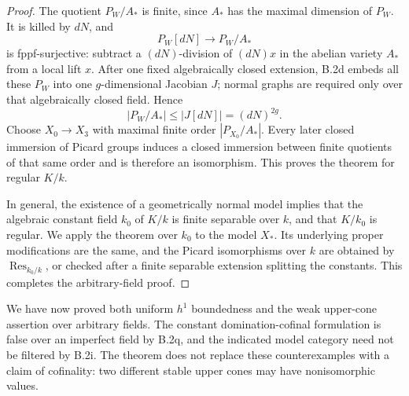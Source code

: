 \begin{proof}
The quotient $P_W/A_*$ is finite, since $A_*$ has the
maximal dimension of $P_W$.  It is killed by $dN$, and
\[
                  P_W[dN]\longrightarrow P_W/A_*
\]
is fppf-surjective: subtract a $(dN)$-division of
$(dN)x$ in the abelian variety $A_*$ from a local lift $x$.
After one fixed algebraically closed extension, B.2d embeds
all these $P_W$ into one $g$-dimensional Jacobian $J$;
normal graphs are required only over that algebraically
closed field.  Hence
\[
                    |P_W/A_*|\le |J[dN]|=(dN)^{2g}.
\]
Choose $X_0\to X_3$ with maximal finite order
$|P_{X_0}/A_*|$.  Every later closed immersion of Picard
groups induces a closed immersion between finite quotients
of that same order and is therefore an isomorphism.
This proves the theorem for regular $K/k$.

In general, the existence of a geometrically normal model
implies that the algebraic constant field $k_0$ of $K/k$
is finite separable over $k$, and that $K/k_0$ is regular.
We apply the theorem over $k_0$ to the model $X_*$.
Its underlying proper modifications are the same, and the
Picard isomorphisms over $k$ are obtained by
$\operatorname{Res}_{k_0/k}$, or checked after a finite
separable extension splitting the constants.  This completes
the arbitrary-field proof.
\end{proof}

\begin{remark}
We have now proved both uniform $h^1$ boundedness and the
weak upper-cone assertion over arbitrary fields.  The
constant domination-cofinal formulation is false over an
imperfect field by B.2q, and the indicated model category
need not be filtered by B.2i.  The theorem does not replace
these counterexamples with a claim of cofinality: two
different stable upper cones may have nonisomorphic values.
\end{remark}
